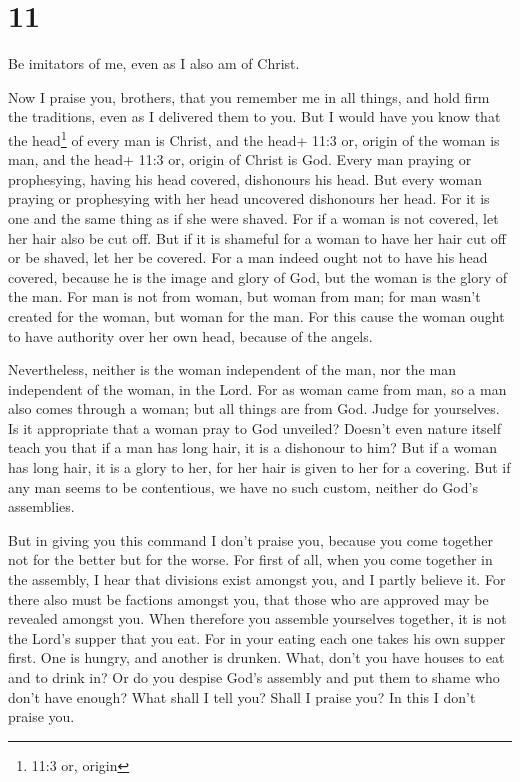 \hypertarget{section-10}{%
\section{11}\label{section-10}}

 Be imitators of me, even as I also am of Christ.

 Now I praise you, brothers, that you remember me in all
things, and hold firm the traditions, even as I delivered them to you.
 But I would have you know that the head\footnote{11:3 or,
  origin} of every man is Christ, and the head+ 11:3 or, origin of the
woman is man, and the head+ 11:3 or, origin of Christ is God.
 Every man praying or prophesying, having his head covered,
dishonours his head.  But every woman praying or prophesying
with her head uncovered dishonours her head. For it is one and the same
thing as if she were shaved.  For if a woman is not covered,
let her hair also be cut off. But if it is shameful for a woman to have
her hair cut off or be shaved, let her be covered.  For a
man indeed ought not to have his head covered, because he is the image
and glory of God, but the woman is the glory of the man. 
For man is not from woman, but woman from man;  for man
wasn't created for the woman, but woman for the man.  For
this cause the woman ought to have authority over her own head, because
of the angels.

 Nevertheless, neither is the woman independent of the man,
nor the man independent of the woman, in the Lord.  For as
woman came from man, so a man also comes through a woman; but all things
are from God.  Judge for yourselves. Is it appropriate that
a woman pray to God unveiled?  Doesn't even nature itself
teach you that if a man has long hair, it is a dishonour to him?
 But if a woman has long hair, it is a glory to her, for
her hair is given to her for a covering.  But if any man
seems to be contentious, we have no such custom, neither do God's
assemblies.

 But in giving you this command I don't praise you, because
you come together not for the better but for the worse. 
For first of all, when you come together in the assembly, I hear that
divisions exist amongst you, and I partly believe it.  For
there also must be factions amongst you, that those who are approved may
be revealed amongst you.  When therefore you assemble
yourselves together, it is not the Lord's supper that you eat.
 For in your eating each one takes his own supper first.
One is hungry, and another is drunken.  What, don't you
have houses to eat and to drink in? Or do you despise God's assembly and
put them to shame who don't have enough? What shall I tell you? Shall I
praise you? In this I don't praise you.

